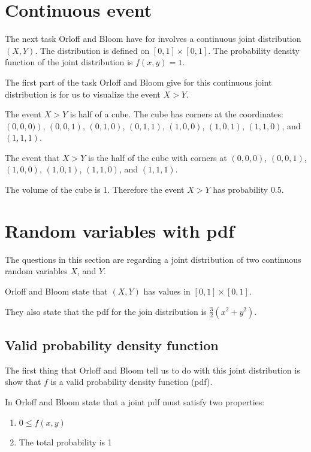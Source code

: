 \documentclass[a4paper,11pt]{article}
\begin{document}
\section{Continuous event}

The next task Orloff and Bloom have for involves
a continuous joint distribution $\left( X, Y \right)$.
The distribution is defined on
$\left[ 0, 1 \right] \times \left[ 0, 1 \right]$.
The probability density function of the joint distribution
is $f\left( x, y \right) = 1$.

The first part of the task Orloff and Bloom give for
this continuous joint distribution is for us to visualize
the event $X > Y$.

The event $X > Y$ is half of a cube. The cube has corners at the
coordinates: $\left(0, 0, 0) \right)$,
$\left(0, 0, 1 \right)$, $\left(0, 1, 0 \right)$,
$\left(0, 1, 1 \right)$, $\left(1, 0, 0 \right)$,
$\left(1, 0, 1 \right)$, $\left(1, 1, 0 \right)$, and
$\left(1, 1, 1 \right)$.

The event that $X>Y$ is the half of the cube with
corners at $\left(0,0,0 \right)$, $\left(0,0,1\right)$,
$\left(1, 0, 0 \right)$, $\left(1, 0, 1 \right)$,
$\left(1, 1, 0 \right)$, and $\left(1, 1, 1 \right)$.

The volume of the cube is 1.  Therefore the event
$X>Y$ has probability $0.5$.

\section{Random variables with pdf}
The questions in this section are regarding a joint distribution
of two continuous random variables $X$, and $Y$.

Orloff and Bloom state that $\left(X, Y \right)$ has values
in $\left[0,1 \right] \times \left[0, 1 \right]$.

They also state that the pdf for the join distribution
is $\frac{3}{2}\left(x^2 + y^2 \right)$.

\subsection{Valid probability density function}
The first thing that Orloff and Bloom tell us to
do with this joint distribution is show that
$f$ is a valid probability density function (pdf).

In \cite{reading7} Orloff and Bloom state that
a joint pdf must satisfy two properties:
\begin{enumerate}
\item $0 \leq f \left(x, y \right)$
\item The total probability is 1
\end{enumerate}
\end{document}
